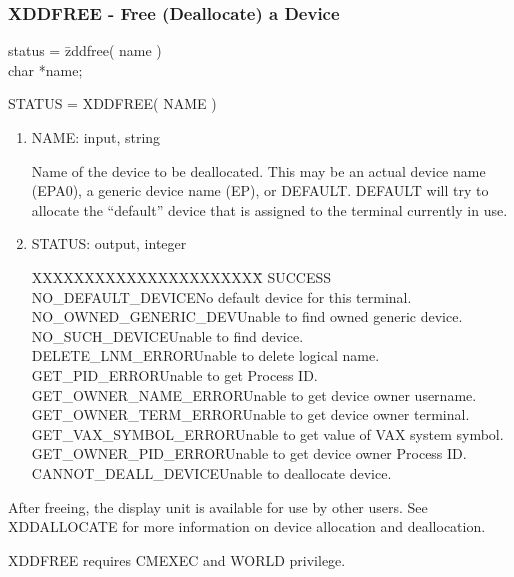 \subsubsection{XDDFREE - Free (Deallocate) a Device}
\begin{tabbing}
status = \=zddfree( name )\\
\>char  *name;\\
\end{tabbing}
STATUS = XDDFREE( NAME )
\begin{enumerate}
\item NAME:  input, string

Name of the device to be deallocated.  This may be an actual device
name (EPA0), a generic device name (EP), or DEFAULT.  DEFAULT will try
to allocate the ``default'' device that is assigned to the terminal
currently in use.
\item STATUS:  output, integer
\begin{tabbing}
XXXXXXXXXXXXXXXXXXXXXX\=\kill
SUCCESS\\
NO\_DEFAULT\_DEVICE\>No default device for this terminal.\\
NO\_OWNED\_GENERIC\_DEV\>Unable to find owned generic device.\\
NO\_SUCH\_DEVICE\>Unable to find device.\\
DELETE\_LNM\_ERROR\>Unable to delete logical name.\\
GET\_PID\_ERROR\>Unable to get Process ID.\\
GET\_OWNER\_NAME\_ERROR\>Unable to get device owner username.\\
GET\_OWNER\_TERM\_ERROR\>Unable to get device owner terminal.\\
GET\_VAX\_SYMBOL\_ERROR\>Unable to get value of VAX system symbol.\\
GET\_OWNER\_PID\_ERROR\>Unable to get device owner Process ID.\\
CANNOT\_DEALL\_DEVICE\>Unable to deallocate device.\\
\end{tabbing}
\end{enumerate}
After freeing, the display unit is available for use by other
users.  See XDDALLOCATE for more information on device allocation and
deallocation.

XDDFREE requires CMEXEC and WORLD privilege.
\newpage
